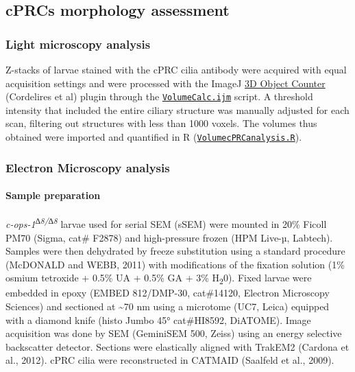 \documentclass[
  11pt,
]{article}
\let\oldparagraph\paragraph
\renewcommand{\paragraph}[1]{\oldparagraph{#1}\mbox{}}
\begin{document}
\subsection{cPRCs morphology
assessment}\label{cprcs-morphology-assessment}

\subsubsection{Light microscopy
analysis}\label{light-microscopy-analysis}

Z-stacks of larvae stained with the cPRC cilia antibody were acquired
with equal acquisition settings and were processed with the ImageJ
\href{https://imagej.nih.gov/ij/plugins/track/objects.html}{3D Object
Counter} (Cordelires et al) plugin through the
\href{https://github.com/JekelyLab/Bezares_et_al_2023_Pressure/blob/main/Code/cPRCmorphology/VolumeCalc.ijm}{\texttt{VolumeCalc.ijm}}
script. A threshold intensity that included the entire ciliary structure
was manually adjusted for each scan, filtering out structures with less
than 1000 voxels. The volumes thus obtained were imported and quantified
in R
(\href{https://github.com/JekelyLab/Bezares_et_al_2023_Pressure/blob/main/Code/cPRCmorphology/VolumecPRCanalysis.R}{\texttt{VolumecPRCanalysis.R}}).

\subsubsection{Electron Microscopy
analysis}\label{electron-microscopy-analysis}

\paragraph{Sample preparation}\label{sample-preparation}

\emph{c-ops-1\textsuperscript{∆8/∆8}} larvae used for serial SEM (sSEM)
were mounted in 20\% Ficoll PM70 (Sigma, cat\# F2878) and high-pressure
frozen (HPM Live-µ, Labtech). Samples were then dehydrated by freeze
substitution using a standard procedure (McDONALD and WEBB, 2011) with
modifications of the fixation solution (1\% osmium tetroxide + 0.5\% UA
+ 0.5\% GA + 3\% H\textsubscript{2}0). Fixed larvae were embedded in
epoxy (EMBED 812/DMP-30, cat\#14120, Electron Microscopy Sciences) and
sectioned at \textasciitilde70 nm using a microtome (UC7, Leica)
equipped with a diamond knife (histo Jumbo 45° cat\#HI8592, DiATOME).
Image acquisition was done by SEM (GeminiSEM 500, Zeiss) using an energy
selective backscatter detector. Sections were elastically aligned with
TrakEM2 (Cardona et al., 2012). cPRC cilia were reconstructed in CATMAID
(Saalfeld et al., 2009).
\end{document}
